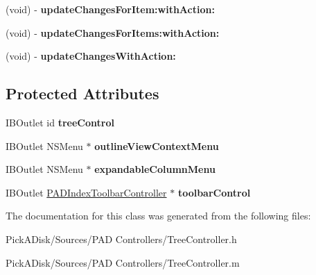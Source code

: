 \begin{DoxyCompactItemize}
\item 
\hypertarget{interface_tree_controller_data_source_ac0d959d052058ab758b659a78fc58693}{
(void) -\/ {\bfseries updateChangesForItem:withAction:}}
\label{interface_tree_controller_data_source_ac0d959d052058ab758b659a78fc58693}

\item 
\hypertarget{interface_tree_controller_data_source_a4d2325cd5a27dfaa71b4a4d9ba5e8965}{
(void) -\/ {\bfseries updateChangesForItems:withAction:}}
\label{interface_tree_controller_data_source_a4d2325cd5a27dfaa71b4a4d9ba5e8965}

\item 
\hypertarget{interface_tree_controller_data_source_a24fe010097df47a66bc98ba17a12b50f}{
(void) -\/ {\bfseries updateChangesWithAction:}}
\label{interface_tree_controller_data_source_a24fe010097df47a66bc98ba17a12b50f}

\end{DoxyCompactItemize}
\subsection*{Protected Attributes}
\begin{DoxyCompactItemize}
\item 
\hypertarget{interface_tree_controller_data_source_a6376939e88d001e05a5b01d0e939ed31}{
IBOutlet id {\bfseries treeControl}}
\label{interface_tree_controller_data_source_a6376939e88d001e05a5b01d0e939ed31}

\item 
\hypertarget{interface_tree_controller_data_source_af65c038c7ca12d44fe72b417b8080a47}{
IBOutlet NSMenu $\ast$ {\bfseries outlineViewContextMenu}}
\label{interface_tree_controller_data_source_af65c038c7ca12d44fe72b417b8080a47}

\item 
\hypertarget{interface_tree_controller_data_source_a58680865dd28034de5822aa9830d6ac8}{
IBOutlet NSMenu $\ast$ {\bfseries expandableColumnMenu}}
\label{interface_tree_controller_data_source_a58680865dd28034de5822aa9830d6ac8}

\item 
\hypertarget{interface_tree_controller_data_source_a972b9b21b45b7a5cc97906f303dfe046}{
IBOutlet \hyperlink{interface_p_a_d_index_toolbar_controller}{PADIndexToolbarController} $\ast$ {\bfseries toolbarControl}}
\label{interface_tree_controller_data_source_a972b9b21b45b7a5cc97906f303dfe046}

\end{DoxyCompactItemize}


The documentation for this class was generated from the following files:\begin{DoxyCompactItemize}
\item 
PickADisk/Sources/PAD Controllers/TreeController.h\item 
PickADisk/Sources/PAD Controllers/TreeController.m\end{DoxyCompactItemize}
